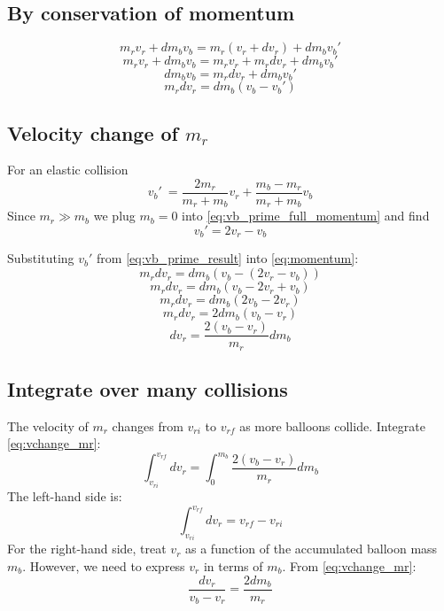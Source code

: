 \documentclass{article}
\begin{document}
\subsection{By conservation of momentum} \[
m_r v_r + dm_b v_b = m_r (v_r + dv_r) + dm_b v_b'
\]
\[
m_r v_r + dm_b v_b = m_r v_r + m_r dv_r + dm_b v_b'
\]
\[
dm_b v_b = m_r dv_r + dm_b v_b'
\]
\begin{equation}
m_r dv_r = dm_b (v_b - v_b') \label{eq:momentum}
\end{equation}

\subsection[Velocity change of rocket mass]{Velocity change of \(m_r\)}
For an elastic collision
\begin{equation}
    v_b'\ = \frac{2m_r}{m_r+m_b}v_r + \frac{m_b-m_r}{m_r+m_b}v_b \label{eq:vb_prime_full_momentum}
\end{equation}
Since \(m_r \gg m_b\)   we plug \(m_b = 0\)  into \autoref{eq:vb_prime_full_momentum} and find 
\begin{equation}
v_b' = 2v_r - v_b  \label{eq:vb_prime_result}
\end{equation}      

Substituting \(v_b'\) from  \autoref{eq:vb_prime_result} into \autoref{eq:momentum}:
\[
m_r dv_r = dm_b (v_b - (2 v_r - v_b))
\]
\[
m_r dv_r = dm_b (v_b - 2 v_r + v_b)
\]
\[
m_r dv_r = dm_b (2 v_b - 2 v_r)
\]
\[
m_r dv_r = 2 dm_b (v_b - v_r)
\]
\begin{equation}
dv_r = \frac{2 (v_b - v_r)}{m_r} dm_b \label{eq:vchange_mr}
\end{equation}

\subsection{Integrate over many collisions}
The velocity of \( m_r \) changes from \( v_{ri} \) to \( v_{rf} \) as more balloons collide. Integrate \autoref{eq:vchange_mr}:
\[
\int_{v_{ri}}^{v_{rf}} dv_r = \int_0^{m_b} \frac{2 (v_b - v_r)}{m_r} dm_b
\]
The left-hand side is:
\[
\int_{v_{ri}}^{v_{rf}} dv_r = v_{rf} - v_{ri}
\]
For the right-hand side, treat \( v_r \) as a function of the accumulated balloon mass \( m_b \). However, we need to express \( v_r \) in terms of \( m_b \). From \autoref{eq:vchange_mr}:
\begin{equation}
\frac{dv_r}{v_b - v_r} = \frac{2 dm_b}{m_r}\label{eq:dvr_velocity_relation}
\end{equation}
\end{document}

